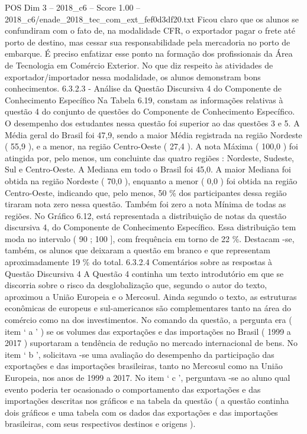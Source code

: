\begin{textsample}{POS Dim 3 – 2018\_c6 – Score 1.00 – 2018\_c6/enade\_2018\_tec\_com\_ext\_fef0d3df20.txt}
Ficou claro que os alunos se confundiram com o fato de, na modalidade CFR, o exportador pagar o frete até porto de destino, mas cessar sua responsabilidade pela mercadoria no porto de embarque.
É preciso enfatizar esse ponto na formação dos profissionais da Área de Tecnologia em Comércio Exterior.
No que diz respeito às atividades de exportador/importador nessa modalidade, os alunos demonstram bons conhecimentos. 6.3.2.3 - Análise da Questão Discursiva 4 do Componente de Conhecimento Específico Na Tabela 6.19, constam as informações relativas à questão 4 do conjunto de questões do Componente de Conhecimento Específico.
O desempenho dos estudantes nessa questão foi superior ao das questões 3 e 5.
A Média geral do Brasil foi 47,9, sendo a maior Média registrada na região Nordeste ( 55,9 ), e a menor, na região Centro-Oeste ( 27,4 ).
A nota Máxima ( 100,0 ) foi atingida por, pelo menos, um concluinte das quatro regiões : Nordeste, Sudeste, Sul e Centro-Oeste.
A Mediana em todo o Brasil foi 45,0.
A maior Mediana foi obtida na região Nordeste ( 70,0 ), enquanto a menor ( 0,0 ) foi obtida na região Centro-Oeste, indicando que, pelo menos, 50 \% dos participantes dessa região tiraram nota zero nessa questão.
Também foi zero a nota Mínima de todas as regiões.
No Gráfico 6.12, está representada a distribuição de notas da questão discursiva 4, do Componente de Conhecimento Específico.
Essa distribuição tem moda no intervalo ( 90 ; 100 ], com frequência em torno de 22 \%.
Destacam -se, também, os alunos que deixaram a questão em branco e que representam aproximadamente 19 \% do total. 6.3.2.4 Comentários sobre as respostas à Questão Discursiva 4 A Questão 4 continha um texto introdutório em que se discorria sobre o risco da desglobalização que, segundo o autor do texto, aproximou a União Europeia e o Mercosul.
Ainda segundo o texto, as estruturas econômicas de europeus e sul-americanos são complementares tanto na área do comércio como na dos investimentos.
No comando da questão, a pergunta era ( item ‘ a ’ ) se os volumes das exportações e das importações no Brasil ( 1999 a 2017 ) suportaram a tendência de redução no mercado internacional de bens.
No item ‘ b ’, solicitava -se uma avaliação do desempenho da participação das exportações e das importações brasileiras, tanto no Mercosul como na União Europeia, nos anos de 1999 a 2017.
No item ‘ c ’, perguntava -se ao aluno qual evento poderia ter ocasionado o comportamento das exportações e das importações descritas nos gráficos e na tabela da questão ( a questão continha dois gráficos e uma tabela com os dados das exportações e das importações brasileiras, com seus respectivos destinos e origens ).

\end{textsample}
